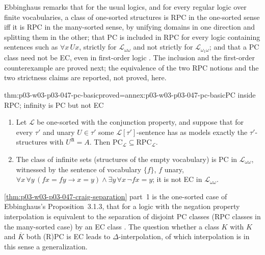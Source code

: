 Ebbinghaus remarks that for the usual logics, and for every regular logic
over finite vocabularies, a class of one-sorted structures is RPC in the
one-sorted sense iff it is RPC in the many-sorted sense, by unifying
domains in one direction and splitting them in the other; that PC is
included in RPC for every logic containing sentences such as
\(\forall x\,Ux\), strictly for \(\mathscr L_{\omega\omega}\) and not
strictly for \(\mathscr L_{\omega_1\omega}\); and that a PC class need not be
EC, even in first-order logic \cite[Ch.~II, Remarks~3.1.2, p.~42]{Ebbinghaus1985ExtendedLogics}.
The inclusion and the first-order counterexample are proved next; the
equivalence of the two RPC notions and the two strictness claims are
reported, not proved, here.

\begin{hbtheorem}{thm:p03-w03-p03-047-pc-basic}{proved=annex:p03-w03-p03-047-pc-basic}{PC inside RPC; infinity is PC but not EC}
\begin{enumerate}
 \item Let \(\mathscr L\) be one-sorted with the conjunction property, and
       suppose that for every \(\tau'\) and unary \(U\in\tau'\) some
       \(\mathscr L[\tau']\)-sentence has as models exactly the
       \(\tau'\)-structures with \(U^{\mathfrak A}=A\).  Then
       \(\mathrm{PC}_{\mathscr L}\subseteq\mathrm{RPC}_{\mathscr L}\).
 \item The class of infinite sets (structures of the empty vocabulary) is PC
       in \(\mathscr L_{\omega\omega}\), witnessed by the sentence of
       vocabulary \(\{f\}\), \(f\) unary,
       \(\forall x\,\forall y\,(fx=fy\to x=y)\land\exists y\,\forall x\,\neg fx=y\);
       it is not EC in \(\mathscr L_{\omega\omega}\).
\end{enumerate}
\end{hbtheorem}

\cref{thm:p03-w03-p03-047-craig-separation} part~1 is the one-sorted case
of Ebbinghaus's Proposition~3.1.3, that for a logic with the negation
property interpolation is equivalent to the separation of disjoint PC classes
(RPC classes in the many-sorted case) by an EC class
\cite[Ch.~II, Proposition~3.1.3, p.~42]{Ebbinghaus1985ExtendedLogics}.  The
question whether a class \(K\) with \(K\) and \(\overline K\) both (R)PC is
EC leads to \(\Delta\)-interpolation, of which interpolation is in this sense
a generalization.


